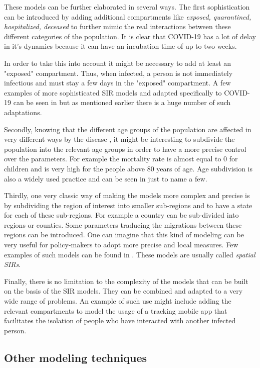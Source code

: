 \documentclass[12pt, letterpaper]{article}
\begin{document}
These models can be further elaborated in several ways. 
The first sophistication can be introduced by adding additional compartments like {\em exposed, quarantined, hospitalized, deceased} to further mimic the real interactions between these different categories of the population. 
It is clear that COVID-19 has a lot of delay in it's dynamics \cite{delay} because it can have an incubation time of up to two weeks. 

In order to take this into account it might be necessary to add at least an "exposed" compartment. 
Thus, when infected, a person is not immediately infectious and must stay a few days in the "exposed" compartment. 
A few examples of more sophisticated SIR models and adapted specifically to COVID-19 can be seen in \cite{seir} but as mentioned earlier there is a huge number of such adaptations.


Secondly, knowing that the different age groups of the population are affected in very different ways by the disease \cite{agegroups}, it might be interesting to subdivide the population into the relevant age groups in order to have a more precise control over the parameters. 
For example the mortality rate is almost equal to 0 for children and is very high for the people above 80 years of age. 
Age subdivision is also a widely used practice and can be seen in \cite{age} just to name a few.

Thirdly, one very classic way of making the models more complex and precise is by subdividing the region of interest into smaller sub-regions and to have a state for each of these sub-regions. 
For example a country can be sub-divided into regions or counties. 
Some parameters traducing the migrations between these regions can be introduced. 
One can imagine that this kind of modeling can be very useful for policy-makers to adopt more precise and local measures. 
Few examples of such models can be found in \cite{spatial}. 
These models are usually called {\em spatial SIRs}. 

Finally, there is no limitation to the complexity of the models that can be built on the basis of the SIR models. 
They can be combined and adapted to a very wide range of problems. 
An example of such use might include adding the relevant compartments to model the usage of a tracking mobile app that facilitates the isolation of people who have interacted with another infected person.

\subsection{Other modeling techniques}
\end{document}
